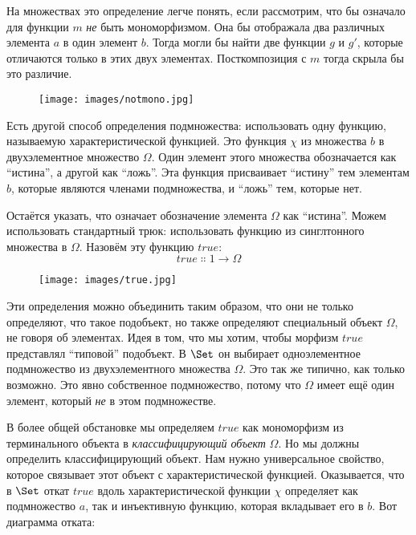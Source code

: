 \noindent
На множествах это определение легче понять, если рассмотрим, что бы
означало для функции $m$ \emph{не} быть мономорфизмом. Она бы
отображала два различных элемента $a$ в один элемент
$b$. Тогда могли бы найти две функции $g$ и
$g'$, которые отличаются только в этих двух элементах.
Посткомпозиция с $m$ тогда скрыла бы это различие.

\begin{figure}[H]
  \centering
  \texttt{[image: images/notmono.jpg]}
\end{figure}

\noindent
Есть другой способ определения подмножества: использовать одну функцию,
называемую характеристической функцией. Это функция $\chi$ из
множества $b$ в двухэлементное множество $\Omega$. Один элемент этого множества
обозначается как ``истина'', а другой как ``ложь''. Эта функция
присваивает ``истину'' тем элементам $b$, которые являются членами
подмножества, и ``ложь'' тем, которые нет.

Остаётся указать, что означает обозначение элемента
$\Omega$ как ``истина''. Можем использовать стандартный трюк: использовать функцию
из синглтонного множества в $\Omega$. Назовём эту функцию
$\mathit{true}$:
\[\mathit{true} \Colon 1 \to \Omega\]

\begin{figure}[H]
  \centering
  \texttt{[image: images/true.jpg]}
\end{figure}

\noindent
Эти определения можно объединить таким образом, что они не только
определяют, что такое подобъект, но также определяют специальный объект
$\Omega$, не говоря об элементах. Идея в том, что мы хотим, чтобы
морфизм $\mathit{true}$ представлял ``типовой'' подобъект. В
$\Set$ он выбирает одноэлементное подмножество из двухэлементного множества
$\Omega$. Это так же типично, как только возможно. Это явно собственное подмножество,
потому что $\Omega$ имеет ещё один элемент, который \emph{не} в этом
подмножестве.

В более общей обстановке мы определяем $\mathit{true}$ как мономорфизм
из терминального объекта в \emph{классифицирующий объект} $\Omega$.
Но мы должны определить классифицирующий объект. Нам нужно универсальное
свойство, которое связывает этот объект с характеристической функцией. Оказывается,
что в $\Set$ откат $\mathit{true}$ вдоль
характеристической функции $\chi$ определяет как подмножество $a$,
так и инъективную функцию, которая вкладывает его в $b$. Вот
диаграмма отката:

